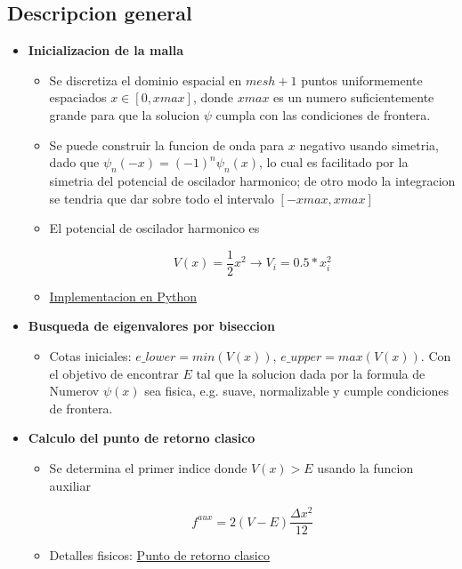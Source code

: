 \documentclass[11pt]{article}
\begin{document}
\subsection{Descripcion general}
\label{sec:org42df0e8}

\begin{itemize}
\item \textbf{Inicializacion de la malla}

\begin{itemize}
\item Se discretiza el dominio espacial en \(mesh + 1\) puntos uniformemente espaciados \(x \in [0,xmax]\), donde \(xmax\) es un numero suficientemente grande para que la solucion \(\psi\) cumpla con las condiciones de frontera.

\item Se puede construir la funcion de onda para \(x\) negativo usando simetria, dado que \(\psi_n(-x) = (-1)^n\psi_n(x)\), lo cual es facilitado por la simetria del potencial de oscilador harmonico; de otro modo la integracion se tendria que dar sobre todo el intervalo \([-xmax, xmax]\)

\item El potencial de oscilador harmonico es

\[ V(x) = \frac{1}{2}x^2 \to V_i = 0.5*x^2_i \]
\item \hyperref[sec:orgdb4bc66]{Implementacion en Python}
\end{itemize}

\item \textbf{Busqueda de eigenvalores por biseccion}

\begin{itemize}
\item Cotas iniciales: \(e\_lower = min(V(x))\), \(e\_upper = max(V(x))\).
Con el objetivo de encontrar \(E\) tal que la solucion dada por la formula de Numerov \(\psi(x)\) sea fisica, e.g. suave, normalizable y cumple condiciones de frontera.
\end{itemize}

\item \textbf{Calculo del punto de retorno clasico}

\begin{itemize}
\item Se determina el primer indice donde \(V(x) > E\) usando la funcion auxiliar

\[ f^{aux} = 2(V-E) \frac{\Delta x^2}{12} \]

\item Detalles fisicos: \hyperref[sec:org7b13b2c]{Punto de retorno clasico}
\end{itemize}


\end{itemize}
\end{document}
